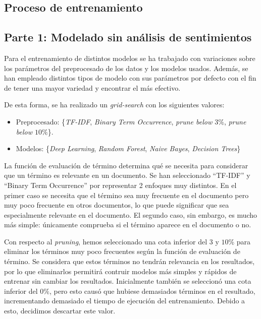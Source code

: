 \documentclass[es]{uc3mreport}
\begin{document}
\begin{report}
\section{Proceso de entrenamiento}
\label{chap:train}

\subsection{Parte 1: Modelado sin análisis de sentimientos}
\label{sec:parte1}

    Para el entrenamiento de distintos modelos se ha trabajado con variaciones
    sobre los parámetros del preprocesado de los datos y los modelos usados.
    Además, se han empleado distintos tipos de modelo con sus
    parámetros por defecto con el fin de tener una mayor variedad y encontrar
    el más efectivo.

    De esta forma, se ha realizado un \textit{grid-search} con los siguientes valores:
    \begin{itemize}
        \item Preprocesado: \{\textit{TF-IDF}, \textit{Binary Term Occurrence}, \textit{prune below $3\%$}, \textit{prune below $10\%$}\}.
        \item Modelos: \{\textit{Deep Learning}, \textit{Random Forest}, \textit{Naive Bayes}, \textit{Decision Trees}\}
    \end{itemize}

    La función de evaluación de término determina qué se necesita para considerar
    que un término es relevante en un documento. Se han seleccionado ``TF-IDF'' y
    ``Binary Term Occurrence'' por representar 2 enfoques muy distintos. En el
    primer caso se necesita que el término sea muy frecuente en el documento pero
    muy poco frecuente en otros documentos, lo que puede significar que sea especialmente
    relevante en el documento. El segundo caso, sin embargo, es mucho más simple:
    únicamente comprueba si el término aparece en el documento o no.

    Con respecto al \textit{pruning}, hemos seleccionado una cota inferior del $3$ y $10$\%
    para eliminar los términos muy poco frecuentes según la función de evaluación
    de término. Se considera que estos términos no tendrán relevancia en los
    resultados, por lo que eliminarlos permitirá contruir modelos más simples y
    rápidos de entrenar sin cambiar los resultados. Inicialmente también se
    seleccionó una cota inferior del $0\%$, pero esto causó que hubiese demasiados
    términos en el resultado, incrementando demasiado el tiempo de ejecución del
    entrenamiento. Debido a esto, decidimos descartar este valor.


\end{report}
\end{document}
